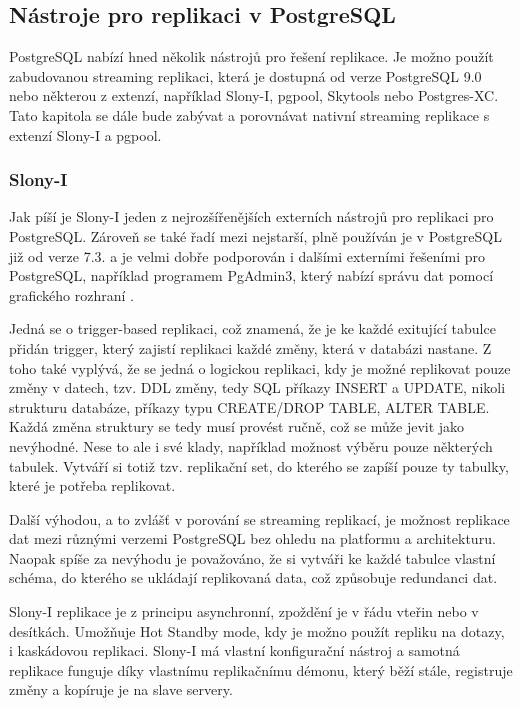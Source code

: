       \subsection{Nástroje pro replikaci v PostgreSQL}

PostgreSQL nabízí hned několik nástrojů pro řešení replikace. Je možno použít zabudovanou streaming replikaci, která je dostupná od verze PostgreSQL 9.0 nebo některou z extenzí, například Slony-I, pgpool, Skytools nebo Postgres-XC. Tato kapitola se dále bude zabývat a porovnávat nativní streaming replikace s extenzí Slony-I a pgpool.

      \subsubsection{Slony-I}
      \label{kSlony}

Jak píší \cite{Boszormenyi2013} je Slony-I jeden z nejrozšířenějších externích nástrojů pro replikaci pro PostgreSQL. Zároveň se také řadí mezi nejstarší, plně používán je v PostgreSQL již od verze 7.3. a je velmi dobře podporován i dalšími externími řešeními pro PostgreSQL, například programem PgAdmin3, který nabízí správu dat pomocí grafického rozhraní \citep{Boszormenyi2013}.

Jedná se o trigger-based replikaci, což znamená, že je ke každé exitující tabulce přidán trigger, který zajistí replikaci každé změny, která v databázi nastane. Z toho také vyplývá, že se jedná o logickou replikaci, kdy je možné replikovat pouze změny v datech, tzv. DDL změny, tedy SQL příkazy INSERT a UPDATE, nikoli strukturu databáze, příkazy typu CREATE/DROP TABLE, ALTER TABLE. Každá změna struktury se tedy musí provést ručně, což se může jevit jako nevýhodné. Nese to ale i své klady, například možnost výběru pouze některých tabulek. Vytváří si totiž tzv. replikační set, do kterého se zapíší pouze ty tabulky, které je potřeba replikovat. 

Další výhodou, a to zvlášť v porování se streaming replikací, je možnost replikace dat mezi různými verzemi PostgreSQL bez ohledu na platformu a architekturu. Naopak spíše za nevýhodu je považováno, že si vytváři ke každé tabulce vlastní schéma, do kterého se ukládají replikovaná data, což způsobuje redundanci dat. 

Slony-I replikace je z principu asynchronní, zpoždění je v řádu vteřin nebo v desítkách. Umožňuje Hot Standby mode, kdy je možno použít repliku na dotazy, i kaskádovou replikaci. Slony-I má vlastní konfigurační nástroj a samotná replikace funguje díky vlastnímu replikačnímu démonu, který běží stále, registruje změny a kopíruje je na slave servery.

